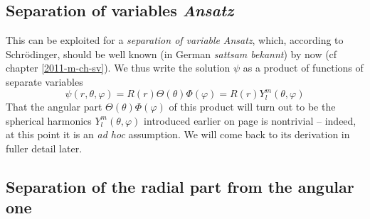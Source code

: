 \subsection{Separation of variables {\it Ansatz}}

This can be exploited for a
{\em separation of variable} {\it Ansatz},
which, according to  Schr\"odinger, should be well known
(in German {\em sattsam bekannt})
by now (cf chapter \ref{2011-m-ch-sv}).
We thus write the solution $\psi$ as a product of functions
of separate variables
\begin{equation}
\psi (r, \theta ,\varphi )=R(r)\Theta(\theta)\Phi(\varphi) = R(r)Y_l^m ( \theta ,\varphi )
\label{2011-m-ch-qaesva}
\end{equation}
That the angular part $\Theta(\theta)\Phi(\varphi)$ of this product
will turn out to be
the spherical harmonics $Y_l^m ( \theta ,\varphi )$  introduced earlier
on page  \pageref{2011-m-ch-sfshar}
is nontrivial -- indeed, at this point it is an {\em ad hoc} assumption.
We will come back to its derivation in fuller detail later.

\subsection{Separation of the radial part from the angular one}

